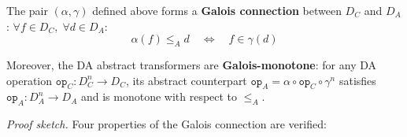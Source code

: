 \vspace{4pt}
\begin{kingthm}
\label{thm:galois}
The pair $(\alpha, \gamma)$ defined above forms a \textbf{Galois
connection} between $D_C$ and $D_A$: $\forall f \in D_C,\;
\forall d \in D_A$:
\begin{equation}
\alpha(f) \leq_A d \quad\Longleftrightarrow\quad f \in \gamma(d)
\label{eq:galois_condition}
\end{equation}

Moreover, the DA abstract transformers are \textbf{Galois-monotone}:
for any DA operation $\texttt{op}_C: D_C^n \to D_C$, its abstract
counterpart $\texttt{op}_A = \alpha \circ \texttt{op}_C \circ
\gamma^n$ satisfies $\texttt{op}_A: D_A^n \to D_A$ and is monotone
with respect to $\leq_A$.
\end{kingthm}

\vspace{2pt}
\noindent\textit{Proof sketch.}
Four properties of the Galois connection are verified:

